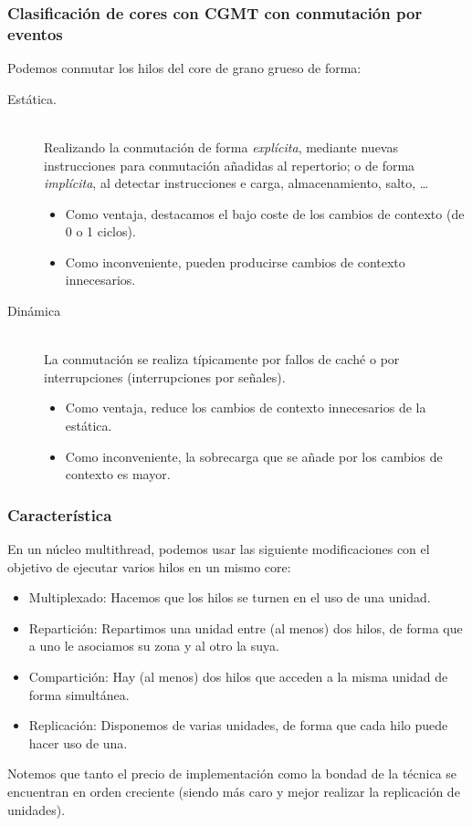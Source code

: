 \subsubsection{Clasificación de cores con CGMT con conmutación por eventos}
Podemos conmutar los hilos del core de grano grueso de forma:
\begin{description}
    \item [Estática.]~\\ 
        Realizando la conmutación de forma \emph{explícita}, mediante nuevas instrucciones para conmutación añadidas al repertorio; o de forma \emph{implícita}, al detectar instrucciones e carga, almacenamiento, salto, \ldots

        \begin{itemize}
            \item Como ventaja, destacamos el bajo coste de los cambios de contexto (de 0 o 1 ciclos).
            \item Como inconveniente, pueden producirse cambios de contexto innecesarios.
        \end{itemize}
    \item [Dinámica]~\\
        La conmutación se realiza típicamente por fallos de caché o por interrupciones (interrupciones por señales).

        \begin{itemize}
            \item Como ventaja, reduce los cambios de contexto innecesarios de la estática.
            \item Como inconveniente, la sobrecarga que se añade por los cambios de contexto es mayor.
        \end{itemize}
\end{description}

\subsubsection{Característica}
En un núcleo multithread, podemos usar las siguiente modificaciones con el objetivo de ejecutar varios hilos en un mismo core:
\begin{itemize}
    \item Multiplexado: Hacemos que los hilos se turnen en el uso de una unidad.
    \item Repartición: Repartimos una unidad entre (al menos) dos hilos, de forma que a uno le asociamos su zona y al otro la suya.
    \item Compartición: Hay (al menos) dos hilos que acceden a la misma unidad de forma simultánea.
    \item Replicación: Disponemos de varias unidades, de forma que cada hilo puede hacer uso de una.
\end{itemize}
Notemos que tanto el precio de implementación como la bondad de la técnica se encuentran en orden creciente (siendo más caro y mejor realizar la replicación de unidades).\\

